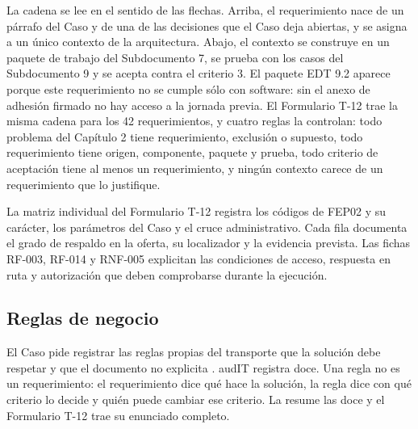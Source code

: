 La cadena se lee en el sentido de las flechas. Arriba, el requerimiento nace de un párrafo del Caso y de
una de las decisiones que el Caso deja abiertas, y se asigna a un único contexto de la arquitectura. Abajo, el contexto se
construye en un paquete de trabajo del Subdocumento 7, se prueba con los casos del Subdocumento 9 y se
acepta contra el criterio 3. El paquete EDT 9.2 aparece porque este requerimiento no se cumple sólo con
software: sin el anexo de adhesión firmado no hay acceso a la jornada previa. El Formulario T-12 trae
la misma cadena para los 42 requerimientos, y cuatro reglas la controlan: todo problema del Capítulo 2
tiene requerimiento, exclusión o supuesto, todo requerimiento tiene origen, componente, paquete y
prueba, todo criterio de aceptación tiene al menos un requerimiento, y ningún contexto carece de un
requerimiento que lo justifique.

La matriz individual del Formulario T-12 registra los códigos de FEP02 y su carácter, los
parámetros del Caso y el cruce administrativo. Cada fila documenta el grado de respaldo en la
oferta, su localizador y la evidencia prevista. Las fichas RF-003, RF-014 y RNF-005 explicitan
las condiciones de acceso, respuesta en ruta y autorización que deben comprobarse durante
la ejecución.

\subsection{Reglas de negocio}\label{sec:3-reglas}

El Caso pide registrar las reglas propias del transporte que la solución debe respetar y que el
documento no explicita . audIT registra doce. Una regla no es un requerimiento:
el requerimiento dice qué hace la solución, la regla dice con qué criterio lo decide y quién puede
cambiar ese criterio. La  resume las doce y el Formulario T-12 trae su enunciado
completo.

